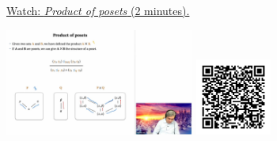 
\begin{minipage}{10cm}
    \href{https://act4e-spring21.netlify.app/videos/spring2021-tradeoffs:tradeoffs:orders:composing-posets:product-poset.html}{Watch: \emph{Product of posets} (2 minutes).}
        
    \href{https://act4e-spring21.netlify.app/videos/spring2021-tradeoffs:tradeoffs:orders:composing-posets:product-poset.html}{\includegraphics[height=3.5cm]{spring2021-tradeoffs:tradeoffs:orders:composing-posets:product-poset/thumbnails.jpg}}
    \href{https://act4e-spring21.netlify.app/videos/spring2021-tradeoffs:tradeoffs:orders:composing-posets:product-poset.html}{\includegraphics[height=2.5cm]{spring2021-tradeoffs:tradeoffs:orders:composing-posets:product-poset/qrcode.png}}
\end{minipage}
